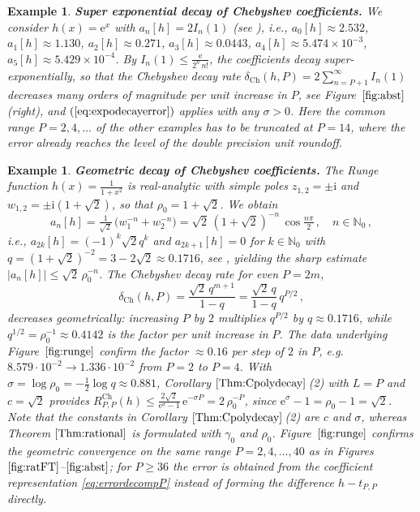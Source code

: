 \documentclass[11pt,a4paper]{scrartcl}
\newtheorem{example}[theorem]{Example}
\numberwithin{equation}{section}
\numberwithin{table}{section}
\numberwithin{figure}{section}
\newcommand{\e}{\mathrm e}
\renewcommand{\i}{\mathrm i}
\newcommand{\Np}{{\mathbb N}_0}
\newcommand{\dch}{\delta_{\mathrm{Ch}}}
\newcommand{\Rch}{R^{\mathrm{Ch}}}
\begin{document}
\begin{example} \textbf{Super exponential decay of Chebyshev coefficients.}
	\label{Ex:expt}
We consider $h(x) = \e^x$ with $a_n[h] = 2 I_n(1)$ (see \textnormal{\cite[Table A.2]{PlPoStTa23}}), i.e.,
	$a_0[h]\approx 2.532$,
	$a_1[h]\approx 1.130$, $a_2[h]\approx 0.271$, $a_3[h]\approx 0.0443$,
	$a_4[h]\approx 5.474\times10^{-3}$, $a_5[h]\approx 5.429\times10^{-4}$. By
	$I_n(1) \leq \frac{\e}{2^n \,n!}$, the coefficients decay super-exponentially,
	so that the Chebyshev decay rate $\dch(h,P) = 2\sum\limits_{n=P+1}^\infty I_n(1)$
	decreases many orders of magnitude per unit increase in $P$, see
	Figure~$\ref{fig:abst}$ (right), and $(\ref{eq:expodecayerror})$ applies with any
	$\sigma>0$. Here the common range $P=2,4,\ldots$ of the other examples has to be
	truncated at $P=14$, where the error already reaches the level of the double precision
	unit roundoff.
\end{example}

\begin{example} \textbf{Geometric decay of Chebyshev coefficients.}
	\label{Ex:runge}
	The Runge function $h(x)=\tfrac{1}{1+x^2}$ is real-analytic with simple poles
	$z_{1,2} = \pm\i$ and $w_{1,2} = \pm\i(1+\sqrt2)$, so that $\rho_0 = 1+\sqrt2$.
	We obtain
	$$
	\textstyle a_n[h] = \tfrac{1}{\sqrt 2}\,\big(w_1^{-n} + w_2^{-n}\big) = \sqrt 2\,(1 + \sqrt 2)^{-n}\, \cos\tfrac{n \pi}{2}\,, \quad n \in \Np\,,
	$$
	i.e., $a_{2k}[h] = (-1)^k\sqrt{2}q^k$ and $a_{2k+1}[h] = 0$ for  $k \in \Np$
	with $q = (1 + \sqrt 2)^{-2} = 3-2\sqrt{2} \approx 0.1716$,  see \textnormal{\cite[Table A.2]{PlPoStTa23}},
	yielding  the sharp estimate $\big|
	a_n[h]\big| \leq \sqrt 2\,\rho_0^{-n}$. The Chebyshev decay rate for even
	$P = 2m$,
	$$
	\textstyle \dch(h,P) = \frac{\sqrt{2}\,q^{m+1}}{1-q} = \frac{\sqrt{2}\,q}{1-q}\,q^{P/2}\,,
	$$
	decreases geometrically: increasing $P$ by $2$ multiplies $q^{P/2}$ by
	$q \approx 0.1716$, while $q^{1/2}=\rho_0^{-1}\approx 0.4142$ is the factor per \emph{unit}
	increase in $P$. The data underlying Figure~$\ref{fig:runge}$ confirm the factor
	$\approx 0.16$ per step of $2$ in $P$, e.g.\ $8.579\cdot10^{-2}\to1.336\cdot10^{-2}$
	from $P=2$ to $P=4$.
	With $\sigma = \log \rho_0 = -\tfrac{1}{2}\log q \approx 0.881$,
	Corollary $\ref{Thm:Cpolydecay}$\,(2) with $L=P$ and $c=\sqrt{2}$ provides
	$\Rch_{P,P}(h)\leq\frac{2\sqrt{2}}{\e^{\sigma}-1}\,\e^{-\sigma
	P} = 2\,\rho_0^{-P}$, since $\e^{\sigma}-1 = \rho_0-1 = \sqrt2$. Note that the constants
	in Corollary $\ref{Thm:Cpolydecay}$\,(2) are $c$ and $\sigma$, whereas Theorem
	$\ref{Thm:rational}$ is formulated with $\gamma_0$ and $\rho_0$.
	Figure~$\ref{fig:runge}$ confirms the geometric convergence on the same range
	$P=2,4,\ldots,40$ as in Figures $\ref{fig:ratFT}$--$\ref{fig:abst}$; for $P\ge 36$ the
	error is obtained from the coefficient representation \eqref{eq:errordecompP} instead of
	forming the difference $h-t_{P,P}$ directly.
\end{example}
\end{document}
